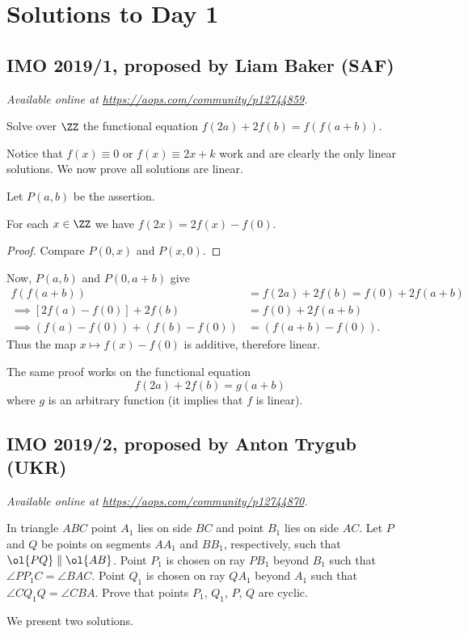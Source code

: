 \documentclass[11pt]{scrartcl}
\begin{document}
\section{Solutions to Day 1}
\subsection{IMO 2019/1, proposed by Liam Baker (SAF)}
\textsl{Available online at \url{https://aops.com/community/p12744859}.}
\begin{mdframed}[style=mdpurplebox,frametitle={Problem statement}]
Solve over $\ZZ$ the functional equation
$f(2a) + 2f(b) = f(f(a+b))$.
\end{mdframed}
Notice that $f(x) \equiv 0$ or $f(x) \equiv 2x+k$ work
and are clearly the only linear solutions.
We now prove all solutions are linear.

Let $P(a,b)$ be the assertion.
\begin{claim*}
  For each $x \in \ZZ$ we have $f(2x) = 2f(x) - f(0)$.
\end{claim*}
\begin{proof}
  Compare $P(0,x)$ and $P(x,0)$.
\end{proof}
Now, $P(a,b)$ and $P(0,a+b)$ give
\begin{align*}
  f(f(a+b)) &= f(2a) + 2f(b) = f(0) + 2f(a+b) \\
  \implies [2f(a) - f(0)] + 2f(b) &= f(0) + 2f(a+b) \\
  \implies \left( f(a)-f(0) \right) + \left( f(b)-f(0) \right)
  &= \left( f(a+b)-f(0) \right).
\end{align*}
Thus the map $x \mapsto f(x) - f(0)$ is additive,
therefore linear.

\begin{remark*}
  The same proof works on the functional equation
  \[ f(2a) + 2f(b) = g(a+b) \]
  where $g$ is an arbitrary function
  (it implies that $f$ is linear).
\end{remark*}
\pagebreak

\subsection{IMO 2019/2, proposed by Anton Trygub (UKR)}
\textsl{Available online at \url{https://aops.com/community/p12744870}.}
\begin{mdframed}[style=mdpurplebox,frametitle={Problem statement}]
In triangle $ABC$ point $A_1$ lies on side $BC$
and point $B_1$ lies on side $AC$.
Let $P$ and $Q$ be points on segments $AA_1$ and $BB_1$,
respectively, such that $\ol{PQ} \parallel \ol{AB}$.
Point $P_1$ is chosen on ray $PB_1$ beyond $B_1$
such that $\angle PP_1C = \angle BAC$.
Point $Q_1$ is chosen on ray $QA_1$ beyond $A_1$
such that $\angle CQ_1Q = \angle CBA$.
Prove that points $P_1$, $Q_1$, $P$, $Q$ are cyclic.
\end{mdframed}
We present two solutions.
\end{document}
